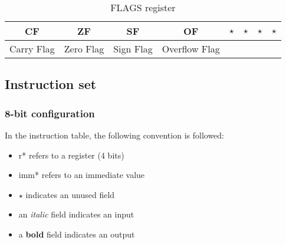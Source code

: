 \documentclass[a4paper,12pt]{article}
\begin{document}
\begin{table}[h]
    \centering
    \begin{tabular}{|c|c|c|c|c|c|c|c|}
        \hline
        CF  & ZF  & SF  & OF & $\star$ & $\star$ & $\star$ & $\star$ \\
        \hline
        Carry Flag & Zero Flag & Sign Flag & Overflow Flag & & & & \\
        \hline
    \end{tabular}
    \caption{FLAGS register}
    \label{tab:flags}
\end{table}

\subsection{Instruction set}
\subsubsection{8-bit configuration}

In the instruction table, the following convention is followed:
\begin{itemize}
    \item r* refers to a register (4 bits)
    \item imm* refers to an immediate value
    \item $\star$ indicates an unused field
    \item an \textit{italic} field indicates an input
    \item a \textbf{bold} field indicates an output
\end{itemize}
\end{document}
